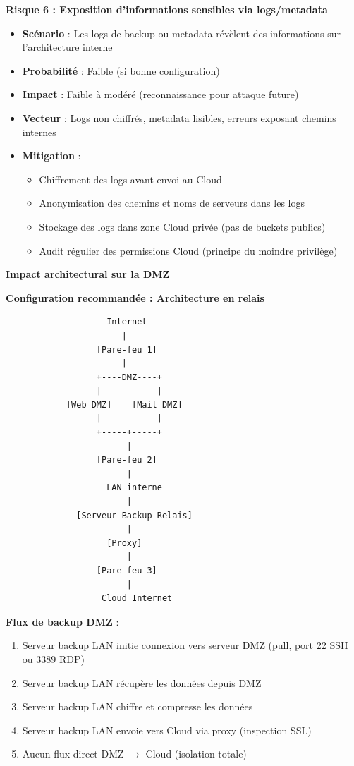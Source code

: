 \medskip

\noindent \textbf{Risque 6 : Exposition d'informations sensibles via logs/metadata}
\begin{itemize}
  \item \textbf{Scénario} : Les logs de backup ou metadata révèlent des informations sur l'architecture interne
  \item \textbf{Probabilité} : Faible (si bonne configuration)
  \item \textbf{Impact} : Faible à modéré (reconnaissance pour attaque future)
  \item \textbf{Vecteur} : Logs non chiffrés, metadata lisibles, erreurs exposant chemins internes
  \item \textbf{Mitigation} :
  \begin{itemize}
    \item Chiffrement des logs avant envoi au Cloud
    \item Anonymisation des chemins et noms de serveurs dans les logs
    \item Stockage des logs dans zone Cloud privée (pas de buckets publics)
    \item Audit régulier des permissions Cloud (principe du moindre privilège)
  \end{itemize}
\end{itemize}

\newpage

\noindent \textbf{Impact architectural sur la DMZ}

\medskip

\noindent \textbf{Configuration recommandée : Architecture en relais}

\begin{verbatim}
                    Internet
                       |
                  [Pare-feu 1]
                       |
                  +----DMZ----+
                  |           |
            [Web DMZ]    [Mail DMZ]
                  |           |
                  +-----+-----+
                        |
                  [Pare-feu 2]
                        |
                    LAN interne
                        |
              [Serveur Backup Relais]
                        |
                    [Proxy]
                        |
                  [Pare-feu 3]
                        |
                   Cloud Internet
\end{verbatim}

\noindent \textbf{Flux de backup DMZ} :
\begin{enumerate}
  \item Serveur backup LAN initie connexion vers serveur DMZ (pull, port 22 SSH ou 3389 RDP)
  \item Serveur backup LAN récupère les données depuis DMZ
  \item Serveur backup LAN chiffre et compresse les données
  \item Serveur backup LAN envoie vers Cloud via proxy (inspection SSL)
  \item Aucun flux direct DMZ $\rightarrow$ Cloud (isolation totale)
\end{enumerate}

